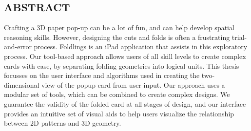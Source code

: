 \pagestyle{plain}
\begin{center}


\section*{ABSTRACT}


\end{center}
Crafting a 3D paper pop-up can be a lot of fun, and can help develop spatial reasoning skills.  However, designing the cuts and folds is often a frustrating trial-and-error process.  Foldlings is an iPad application that assists in this exploratory process.   Our tool-based approach allows users of all skill levels to create complex cards with ease, by separating folding geometries into logical units.  This thesis focusses on the user interface and algorithms used in creating the two-dimensional view of the popup card from user input.
Our approach uses a modular set of tools, which can be combined to create complex designs.  We guarantee the validity of the folded card at all stages of design, and our interface provides an intuitive set of visual aids to help users visualize the relationship between 2D patterns and 3D geometry.

\cleardoublepage
